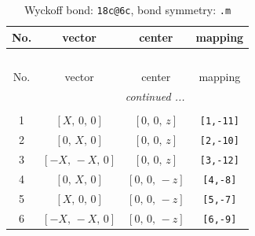 \documentclass[fleqn,8pt]{jsarticle}
\begin{document}
\renewcommand{\arraystretch}{1.2}
\begin{longtable}{cccc}
\caption{Wyckoff bond: {\tt 18c@6c}, bond symmetry: {\tt .m}}
 \\
 \hline \hline
No. & vector & center & mapping \\ \hline \endfirsthead

\multicolumn{3}{l}{\tablename\ \thetable{}} \\
 \hline \hline
No. & vector & center & mapping \\ \hline \endhead

 \hline \hline
\multicolumn{3}{r}{\footnotesize\it continued ...} \\ \endfoot

 \hline \hline
\multicolumn{3}{r}{} \\ \endlastfoot

1 & $\left[ X,\, 0,\, 0 \right]$ & $\left[ 0,\, 0,\, z \right]$ & {\tt [1,-11]} \\ \hline
2 & $\left[ 0,\, X,\, 0 \right]$ & $\left[ 0,\, 0,\, z \right]$ & {\tt [2,-10]} \\ \hline
3 & $\left[ - X,\, - X,\, 0 \right]$ & $\left[ 0,\, 0,\, z \right]$ & {\tt [3,-12]} \\ \hline
4 & $\left[ 0,\, X,\, 0 \right]$ & $\left[ 0,\, 0,\, - z \right]$ & {\tt [4,-8]} \\ \hline
5 & $\left[ X,\, 0,\, 0 \right]$ & $\left[ 0,\, 0,\, - z \right]$ & {\tt [5,-7]} \\ \hline
6 & $\left[ - X,\, - X,\, 0 \right]$ & $\left[ 0,\, 0,\, - z \right]$ & {\tt [6,-9]} \\
\end{longtable}
\renewcommand{\arraystretch}{1.2}
\end{document}
